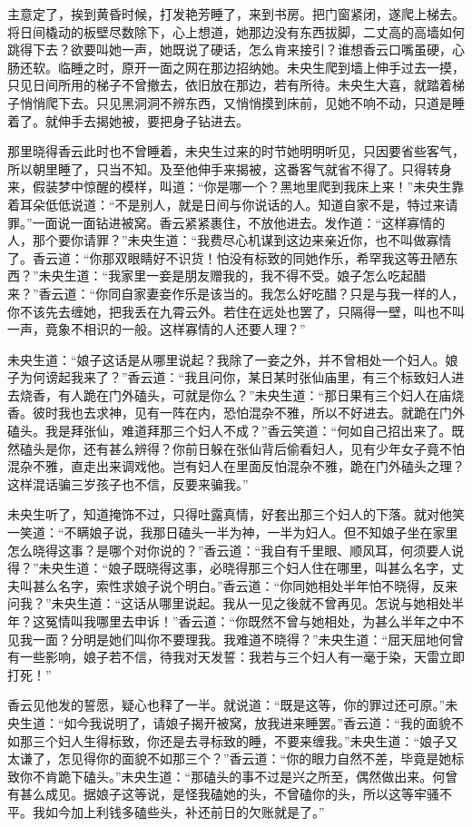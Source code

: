 \documentclass[a4paper,12pt,UTF8,twoside]{ctexbook}
\begin{document}
主意定了，挨到黄昏时候，打发艳芳睡了，来到书房。把门窗紧闭，遂爬上梯去。将日间橇动的板壁尽数除下，心上想道，她那边没有东西拔脚，二丈高的高墙如何跳得下去？欲要叫她一声，她既说了硬话，怎么肯来接引？谁想香云口嘴虽硬，心肠还软。临睡之时，原开一面之网在那边招纳她。未央生爬到墙上伸手过去一摸，只见日间所用的梯子不曾撤去，依旧放在那边，若有所待。未央生大喜，就踏着梯子悄悄爬下去。只见黑洞洞不辨东西，又悄悄摸到床前，见她不响不动，只道是睡着了。就伸手去揭她被，要把身子钻进去。

那里晓得香云此时也不曾睡着，未央生过来的时节她明明听见，只因要省些客气，所以朝里睡了，只当不知。及至他伸手来揭被，这番客气就省不得了。只得转身来，假装梦中惊醒的模样，叫道：“你是哪一个？黑地里爬到我床上来！”未央生靠着耳朵低低说道：“不是别人，就是日间与你说话的人。知道自家不是，特过来请罪。”一面说一面钻进被窝。香云紧紧裹住，不放他进去。发作道：“这样寡情的人，那个要你请罪？”未央生道：“我费尽心机谋到这边来亲近你，也不叫做寡情了。香云道：“你那双眼睛好不识货！怕没有标致的同她作乐，希罕我这等丑陋东西？”未央生道：“我家里一妾是朋友赠我的，我不得不受。娘子怎么吃起醋来？”香云道：“你同自家妻妾作乐是该当的。我怎么好吃醋？只是与我一样的人，你不该先去缠她，把我丢在九霄云外。若住在远处也罢了，只隔得一壁，叫也不叫一声，竟象不相识的一般。这样寡情的人还要人理？”

未央生道：“娘子这话是从哪里说起？我除了一妾之外，并不曾相处一个妇人。娘子为何谤起我来了？”香云道：“我且问你，某日某时张仙庙里，有三个标致妇人进去烧香，有人跪在门外磕头，可就是你么？”未央生道：“那日果有三个妇人在庙烧香。彼时我也去求神，见有一阵在内，恐怕混杂不雅，所以不好进去。就跪在门外磕头。我是拜张仙，难道拜那三个妇人不成？”香云笑道：“何如自己招出来了。既然磕头是你，还有甚么辨得？你前日躲在张仙背后偷看妇人，见有少年女子竟不怕混杂不雅，直走出来调戏他。岂有妇人在里面反怕混杂不雅，跪在门外磕头之理？这样混话骗三岁孩子也不信，反要来骗我。”

未央生听了，知道掩饰不过，只得吐露真情，好套出那三个妇人的下落。就对他笑一笑道：“不瞒娘子说，我那日磕头一半为神，一半为妇人。但不知娘子坐在家里怎么晓得这事？是哪个对你说的？”香云道：“我自有千里眼、顺风耳，何须要人说得？”未央生道：“娘子既晓得这事，必晓得那三个妇人住在哪里，叫甚么名字，丈夫叫甚么名字，索性求娘子说个明白。”香云道：“你同她相处半年怕不晓得，反来问我？”未央生道：“这话从哪里说起。我从一见之後就不曾再见。怎说与她相处半年？这冤情叫我哪里去申诉！”香云道：“你既然不曾与她相处，为甚么半年之中不见我一面？分明是她们叫你不要理我。我难道不晓得？”未央生道：“屈天屈地何曾有一些影响，娘子若不信，待我对天发誓：我若与三个妇人有一毫于染，天雷立即打死！”

香云见他发的誓愿，疑心也释了一半。就说道：“既是这等，你的罪过还可原。”未央生道：“如今我说明了，请娘子揭开被窝，放我进来睡罢。”香云道：“我的面貌不如那三个妇人生得标致，你还是去寻标致的睡，不要来缠我。”未央生道：“娘子又太谦了，怎见得你的面貌不如那三个？”香云道：“你的眼力自然不差，毕竟是她标致你不肯跪下磕头。”未央生道：“那磕头的事不过是兴之所至，偶然做出来。何曾有甚么成见。据娘子这等说，是怪我磕她的头，不曾磕你的头，所以这等牢骚不平。我如今加上利钱多磕些头，补还前日的欠账就是了。”
\end{document}
